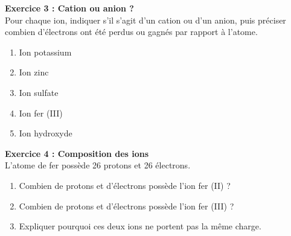 \documentclass[11pt,a4paper]{article}
\newcommand{\cadreblanc}[1]{%
	\medskip\framebox[\linewidth][c]{%
		\rule{0mm}{#1mm}}\par
	\medskip}
\begin{document}
	\vspace{5mm}
	
	
	
	\textbf{Exercice 3 : Cation ou anion ?} \\
	
	Pour chaque ion, indiquer s'il s'agit d'un cation ou d'un anion, puis préciser combien d'électrons ont été perdus ou gagnés par rapport à l'atome.
	
	\begin{enumerate}
		\item Ion potassium 
		
		\cadreblanc{15}
		
		\item Ion zinc 
		
		\cadreblanc{15}
		
		\item Ion sulfate 
		
		\cadreblanc{15}
		
		\item Ion fer (III) 
		
		\cadreblanc{15}
		
		\item Ion hydroxyde 
		
		\cadreblanc{15}
	\end{enumerate}
	
	\vfill
	
	\textbf{Exercice 4 : Composition des ions} \\
	
	L'atome de fer possède 26 protons et 26 électrons.
	
	\begin{enumerate}
		\item Combien de protons et d'électrons possède l'ion fer (II)  ?
		
		\cadreblanc{15}
		
		\item Combien de protons et d'électrons possède l'ion fer (III)  ?
		
		\cadreblanc{15}
		
		\item Expliquer pourquoi ces deux ions ne portent pas la même charge.
		
		\cadreblanc{15}
	\end{enumerate}
	
	\vfill
	
	\newpage
	
\end{document}
